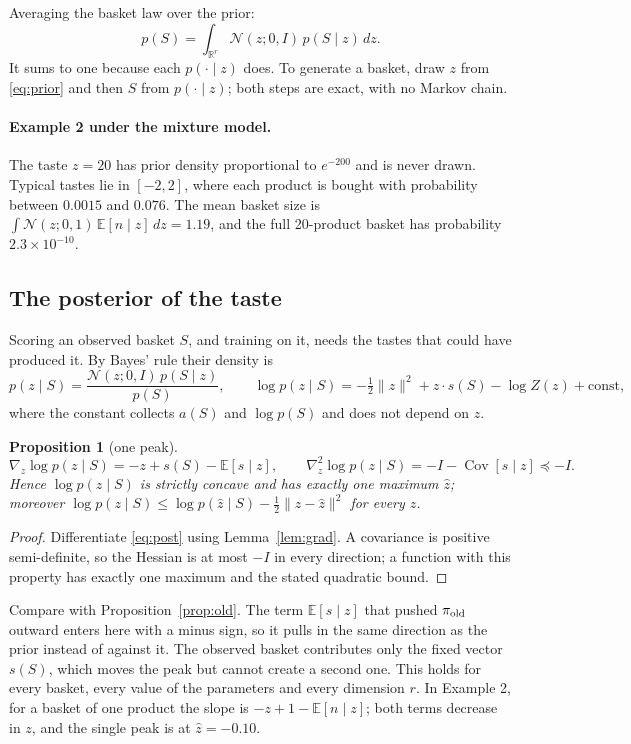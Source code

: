 \documentclass[11pt,a4paper]{article}
\newtheorem{proposition}{Proposition}
\newcommand{\N}{\mathcal N}
\newcommand{\E}{\mathbb E}
\newcommand{\R}{\mathbb R}
\newcommand{\Cov}{\operatorname{Cov}}
\begin{document}
Averaging the basket law over the prior:
\begin{equation}
p(S)=\int_{\R^r}\N(z;0,I)\,p(S\mid z)\,dz .
\label{eq:mix}
\end{equation}
It sums to one because each $p(\cdot\mid z)$ does. To generate a basket, draw $z$ from \eqref{eq:prior} and then $S$
from $p(\cdot\mid z)$; both steps are exact, with no Markov chain.

\paragraph{Example 2 under the mixture model.} The taste $z=20$ has prior density proportional to $e^{-200}$ and
is never drawn. Typical tastes lie in $[-2,2]$, where each product is bought with probability between $0.0015$
and $0.076$. The mean basket size is $\int\N(z;0,1)\,\E[n\mid z]\,dz=1.19$, and the full 20-product basket has
probability $2.3\times10^{-10}$.

\subsection{The posterior of the taste}

Scoring an observed basket $S$, and training on it, needs the tastes that could have produced it. By Bayes' rule
their density is
\begin{equation}
p(z\mid S)=\frac{\N(z;0,I)\,p(S\mid z)}{p(S)},\qquad
\log p(z\mid S)=-\tfrac12\lVert z\rVert^2+z\cdot s(S)-\log Z(z)+\text{const},
\label{eq:post}
\end{equation}
where the constant collects $a(S)$ and $\log p(S)$ and does not depend on $z$.

\begin{proposition}[one peak]\label{prop:mix}
\[
\nabla_z\log p(z\mid S)=-z+s(S)-\E[s\mid z],\qquad
\nabla_z^2\log p(z\mid S)=-I-\Cov[s\mid z]\preceq-I .
\]
Hence $\log p(z\mid S)$ is strictly concave and has exactly one maximum $\hat z$; moreover
$\log p(z\mid S)\le\log p(\hat z\mid S)-\tfrac12\lVert z-\hat z\rVert^2$ for every $z$.
\end{proposition}
\begin{proof}
Differentiate \eqref{eq:post} using Lemma~\ref{lem:grad}. A covariance is positive semi-definite, so the Hessian is at
most $-I$ in every direction; a function with this property has exactly one maximum and the stated quadratic bound.
\end{proof}

Compare with Proposition~\ref{prop:old}. The term $\E[s\mid z]$ that pushed $\pi_{\rm old}$ outward enters here with a minus
sign, so it pulls in the same direction as the prior instead of against it. The observed basket contributes only
the fixed vector $s(S)$, which moves the peak but cannot create a second one. This holds for every basket, every
value of the parameters and every dimension $r$. In Example 2, for a basket of one product the slope is
$-z+1-\E[n\mid z]$; both terms decrease in $z$, and the single peak is at $\hat z=-0.10$.
\end{document}
